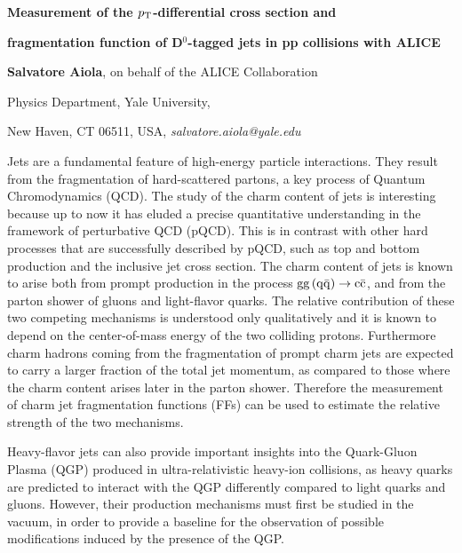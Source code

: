 \documentclass[12pt]{article}
\begin{document}
\centerline{\bf 
Measurement of the $p_{\rm T}$-differential cross section and
}

\centerline{\bf 
fragmentation function of D$^0$-tagged jets in pp collisions with ALICE
}

\vspace{12pt}

\centerline{ {\bf Salvatore Aiola}, on behalf of the ALICE Collaboration }

\vspace{12pt}

\centerline{Physics Department, Yale University,
}\centerline{New Haven, CT 06511, USA, {\it salvatore.aiola@yale.edu}}

\vspace{12pt}


\vspace{12pt} \vspace{12pt}

Jets are a fundamental feature of high-energy particle interactions. 
They result from the fragmentation of hard-scattered partons, 
a key process of Quantum Chromodynamics (QCD). 
The study of the charm content of jets is interesting because up to now
it has eluded a precise quantitative understanding in the framework of perturbative
QCD (pQCD). This is in contrast with other hard processes that are successfully described
by pQCD, such as top and bottom production and the inclusive jet cross section.
The charm content of jets is known to arise both from prompt production in the process ${\rm gg\, (q\bar{q})} \rightarrow {\rm c\bar{c}}$, and
from the parton shower of gluons and light-flavor quarks.
The relative contribution of these two competing mechanisms is understood only qualitatively
and it is known to depend on the center-of-mass energy of the two colliding protons.
Furthermore charm hadrons coming from the fragmentation of prompt charm jets 
are expected to carry a larger fraction of the total jet momentum,
as compared to those where the charm content arises later in the
parton shower. Therefore the measurement of charm jet fragmentation functions (FFs) 
can be used to estimate the relative strength of the two mechanisms.

Heavy-flavor jets can also provide important insights into the Quark-Gluon Plasma (QGP)
produced in ultra-relativistic heavy-ion collisions, as heavy quarks are predicted
to interact with the QGP differently compared to light quarks and gluons. 
However, their production mechanisms must first be studied in the vacuum, 
in order to provide a baseline for the observation of possible modifications induced by the presence of the QGP. 
\end{document}
